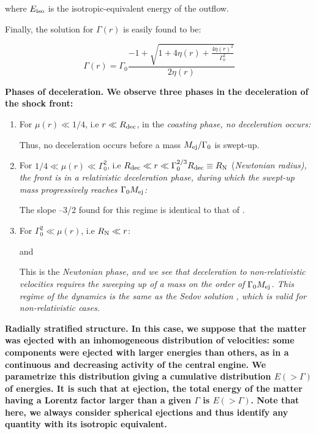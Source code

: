 where $E_\rm{iso}$ is the isotropic-equivalent energy of the outflow.

Finally, the solution for $\Gamma(r)$ is easily found to be:

\begin{equation}\Gamma(r) = \Gamma_0 \frac{-1 + \sqrt{1 + 4\eta(r) + \frac{4\eta(r) ^ 2}{\Gamma_0^2}}}{2 \eta(r)}\end{equation}

\bf{Phases of deceleration.} We observe three phases in the deceleration of the shock front:

\begin{enumerate}
	\item For $\mu(r) \ll 1/4$, i.e $r \ll R_{\rm{dec}}$, in the \it{coasting phase}, no deceleration occurs:


    Thus, no deceleration occurs before a mass $M_{\rm{ej}}/\Gamma_0$ is swept-up.

	\item For $1/4 \ll \mu(r) \ll \Gamma_0 ^ 2$, i.e $R_{\rm{dec}} \ll r \ll \Gamma_0^{2/3} R_{\rm{dec}} \equiv R_{\rm{N}}$ (\it{Newtonian radius}), the front is in a \it{relativistic deceleration phase}, during which the swept-up mass progressively reaches $\Gamma_0 M_{\rm{ej}}$:


    The slope --3/2 found for this regime is identical to that of \citet{59}.

	\item For $\Gamma_0^2 \ll \mu(r)$, i.e $ R_{\rm{N}} \ll r$:


	and


	This is the \it{Newtonian phase}, and we see that deceleration to non-relativistic velocities requires the sweeping up of a mass on the order of $\Gamma_0 M_{\rm{ej}}$. This regime of the dynamics is the same as the Sedov solution \citep{60}, which is valid for non-relativistic cases.
\end{enumerate}

\bf{Radially stratified structure.} In this case, we suppose that the matter was ejected with an inhomogeneous distribution of velocities: some components were ejected with larger energies than others, as in a continuous and decreasing activity of the central engine. We parametrize this distribution giving a cumulative distribution $E( > \Gamma)$ of energies. It is such that at ejection, the total energy of the matter having a Lorentz factor larger than a given $\Gamma$ is $E( > \Gamma)$. Note that here, we always consider spherical ejections and thus identify any quantity with its isotropic equivalent.

